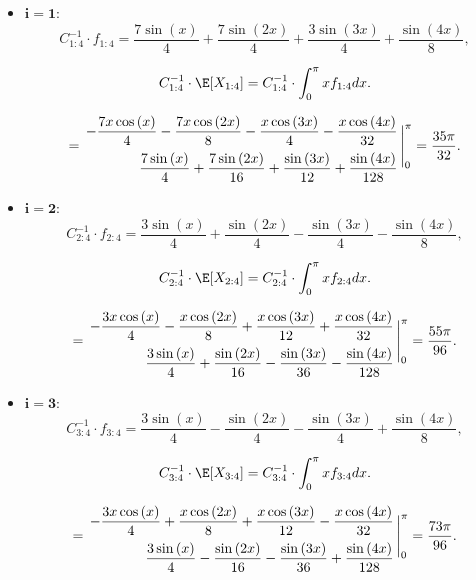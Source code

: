 \begin{itemize}
    \item $\boldsymbol{i = 1:}$ 
    \[ C_{1:4}^{-1} \cdot f_{1:4} = \frac{7 \sin{\left(x \right)}}{4} + \frac{7 \sin{\left(2 x \right)}}{4} + \frac{3 \sin{\left(3 x \right)}}{4} + \frac{\sin{\left(4 x \right)}}{8},\]

    \[ C_{1:4}^{-1} \cdot \E[X_{1:4}] = C_{1:4}^{-1} \cdot \int_0^\pi x f_{1:4} dx.\]
    \[ = \everymath{\displaystyle}
    \arraycolsep=1.8pt\def\arraystretch{2.2}
    \begin{array}{r}
        - \frac{7 x \cos{\left(x \right)}}{4} - \frac{7 x \cos{\left(2 x \right)}}{8} - \frac{x \cos{\left(3 x \right)}}{4} - \frac{x \cos{\left(4 x \right)}}{32}\\
        \frac{7 \sin{\left(x \right)}}{4} + \frac{7 \sin{\left(2 x \right)}}{16} + \frac{\sin{\left(3 x \right)}}{12} + \frac{\sin{\left(4 x \right)}}{128}
    \end{array} \Bigg|_0^\pi = \frac{35 \pi}{32}. \]


    \item $\boldsymbol{i = 2:}$ 
    \[ C_{2:4}^{-1} \cdot f_{2:4} = \frac{3 \sin{\left(x \right)}}{4} + \frac{\sin{\left(2 x \right)}}{4} - \frac{\sin{\left(3 x \right)}}{4} - \frac{\sin{\left(4 x \right)}}{8},\]

    \[ C_{2:4}^{-1} \cdot \E[X_{2:4}] =  C_{2:4}^{-1} \cdot \int_0^\pi x f_{2:4} dx.\]
    \[ = \everymath{\displaystyle}
    \arraycolsep=1.8pt\def\arraystretch{2.2}
    \begin{array}{r}
        - \frac{3 x \cos{\left(x \right)}}{4} - \frac{x \cos{\left(2 x \right)}}{8} + \frac{x \cos{\left(3 x \right)}}{12} + \frac{x \cos{\left(4 x \right)}}{32}\\
        \frac{3 \sin{\left(x \right)}}{4} + \frac{\sin{\left(2 x \right)}}{16} - \frac{\sin{\left(3 x \right)}}{36} - \frac{\sin{\left(4 x \right)}}{128}
    \end{array} \Bigg|_0^\pi = \frac{55 \pi}{96}. \]


    \item $\boldsymbol{i = 3:}$
    \[ C_{3:4}^{-1} \cdot f_{3:4} = \frac{3 \sin{\left(x \right)}}{4} - \frac{\sin{\left(2 x \right)}}{4} - \frac{\sin{\left(3 x \right)}}{4} + \frac{\sin{\left(4 x \right)}}{8},\]

    \[ C_{3:4}^{-1} \cdot \E[X_{3:4}] = C_{3:4}^{-1} \cdot \int_0^\pi x f_{3:4} dx.\]
    \[ = \everymath{\displaystyle}
    \arraycolsep=1.8pt\def\arraystretch{2.2}
    \begin{array}{r}
        - \frac{3 x \cos{\left(x \right)}}{4} + \frac{x \cos{\left(2 x \right)}}{8} + \frac{x \cos{\left(3 x \right)}}{12} - \frac{x \cos{\left(4 x \right)}}{32}\\
        \frac{3 \sin{\left(x \right)}}{4} - \frac{\sin{\left(2 x \right)}}{16} - \frac{\sin{\left(3 x \right)}}{36} + \frac{\sin{\left(4 x \right)}}{128}
    \end{array} \Bigg|_0^\pi = \frac{73 \pi}{96}. \]


\end{itemize}
